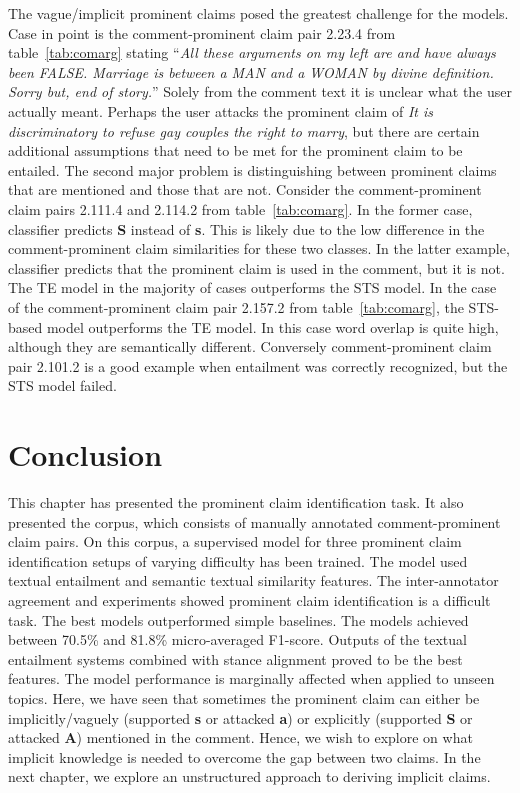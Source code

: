 The vague/implicit prominent claims posed the greatest challenge for the models. 
Case in point is the comment-prominent claim pair 2.23.4 from table~\ref{tab:comarg}  stating 
``\textit{All these arguments on my left are and have always been FALSE. Marriage is
between a MAN and a WOMAN by divine definition. Sorry but, end of story.}''
Solely from the comment text it is unclear what the user actually meant. 
Perhaps the user attacks the prominent claim of 
\textit{ It is discriminatory to refuse gay couples the right to marry},
but there are certain additional assumptions that need to be met for the prominent claim 
to be entailed. 
The second major problem is distinguishing between prominent claims that are mentioned 
and those that are not. 
Consider the comment-prominent claim pairs 2.111.4 and 2.114.2 from table~\ref{tab:comarg}. 
In the former case, classifier predicts \textbf{S} instead of \textbf{s}. 
This is likely due to the low difference in the comment-prominent claim similarities for these
two classes. 
In the latter example, classifier predicts that the prominent claim is used in the comment, but
it is not. 
The TE model in the majority of cases outperforms the STS model. 
In the case of the comment-prominent claim pair 2.157.2 from table~\ref{tab:comarg}, the STS-based
model outperforms the TE model. 
In this case word overlap is quite high, although they are semantically different. 
Conversely comment-prominent claim pair 2.101.2 is a good example when
entailment was correctly recognized, 
but the STS model failed. 


\section{Conclusion}
\label{sec:argrec_conclusion}

This chapter has presented the prominent claim identification task. 
It also presented the \ComArg corpus, which consists of manually annotated
comment-prominent claim pairs. 
On this corpus, a supervised model for three prominent claim identification 
setups of varying difficulty has been trained. 
The model used textual entailment and semantic textual similarity features. 
The inter-annotator agreement  and experiments showed prominent claim identification
is a difficult task. 
The best models outperformed simple baselines. 
The models achieved between 70.5\% and 81.8\% micro-averaged F1-score. 
Outputs of the textual entailment systems combined with stance alignment proved
to be the best features.
The model performance is marginally affected when applied to unseen topics. 
Here, we have seen that sometimes the prominent claim can either be implicitly/vaguely 
(supported \textbf{s} or attacked \textbf{a}) or explicitly (supported \textbf{S} or attacked
\textbf{A}) mentioned in the comment. Hence, we wish to explore on what implicit knowledge is
needed to overcome the gap between two claims. 
In the next chapter, we explore an unstructured approach to deriving implicit claims. 
